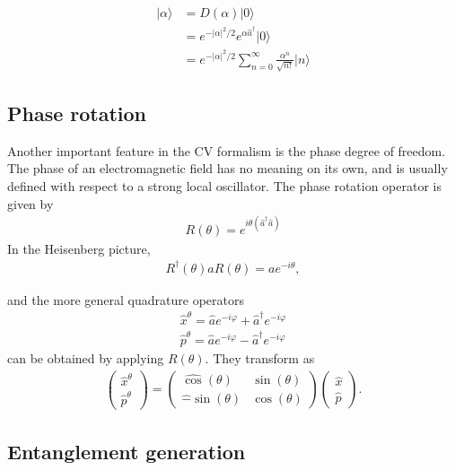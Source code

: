 \documentclass[pra,
superscriptaddress,
 amsmath,amssymb,
 aps,twocolumn]{revtex4-1}
\newcommand{\ket}[1]{|{#1}\rangle}
\begin{document}
\begin{align} \displaystyle
\ket{\alpha} &= D(\alpha) \ket{0}\\
			 &= e^{-|\alpha|^2/2} e^{\alpha 
\hat a^\dagger}\ket{0} \\
			 &= e^{-|\alpha|^2/2} \sum_{n=0}^\infty \frac{\alpha^n}{\sqrt{n!}}\ket{n}
\end{align}


\subsection{Phase rotation}
Another important feature in the CV formalism is the phase degree of freedom. The phase of an
electromagnetic field has no meaning on its own, and is usually defined with respect to a strong local oscillator.
The phase rotation operator is given by 
\begin{align}
R(\theta) = e^{i\theta(\hat a^\dagger \hat a) }
\end{align}
In the Heisenberg picture,
\begin{align}
R^\dagger(\theta) a R(\theta) = a e^{-i\theta},
\end{align}

\noindent and the more general quadrature operators 
\begin{eqnarray}
\hat x ^{\theta} = \hat a e^{-i \varphi} + \hat a^\dagger e^{-i\varphi}\\
\hat p ^{\theta} = \hat a e^{-i \varphi} - \hat a^\dagger e^{-i\varphi}
\end{eqnarray}
\noindent can be obtained by applying $R(\theta)$. They transform as
\begin{eqnarray}
\begin{pmatrix}
\hat x ^{\theta}\\
\hat p ^{\theta}

\end{pmatrix}
=
\begin{pmatrix}
\hat \cos(\theta) & \sin(\theta) \\
\hat -\sin(\theta) & \cos(\theta)
\end{pmatrix}
\begin{pmatrix}
\hat x\\
\hat p
\end{pmatrix}.
\end{eqnarray}



\subsection{Entanglement generation}
\end{document}
